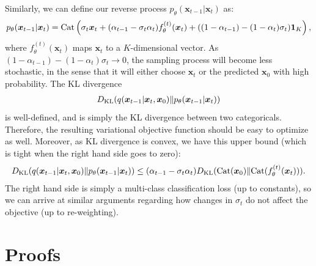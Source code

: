Similarly, we can define our reverse process $p_\theta(\bm{x}_{t-1} | \bm{x}_t)$ as:
\begin{align}
    p_\theta(\bm{x}_{t-1} | \bm{x}_t) = \mathrm{Cat}\left(\sigma_t \bm{x}_t + (\alpha_{t-1} - \sigma_t \alpha_t) f_\theta^{(t)}(\bm{x}_t) + ((1 - \alpha_{t-1}) - (1 - \alpha_t) \sigma_t) {\bm{1}}_K\right),
\end{align}
where $f_\theta^{(t)}(\bm{x}_t)$ maps $\bm{x}_t$ to a $K$-dimensional vector. As $(1 - \alpha_{t-1}) - (1 - \alpha_t) \sigma_t \to 0$, the sampling process will become less stochastic, in the sense that it will either choose $\bm{x}_t$ or the predicted $\bm{x}_0$ with high probability.
The KL divergence
\begin{align}
    D_{\mathrm{KL}}(q(\bm{x}_{t-1} | \bm{x}_t, \bm{x}_0) \Vert p_\theta(\bm{x}_{t-1} | \bm{x}_t))
\end{align}
is well-defined, and is simply the KL divergence between two categoricals. Therefore, the resulting variational objective function should be easy to optimize as well. Moreover, as KL divergence is convex, we have this upper bound (which is tight when the right hand side goes to zero):
\begin{align}
    D_{\mathrm{KL}}(q(\bm{x}_{t-1} | \bm{x}_t, \bm{x}_0) \Vert p_\theta(\bm{x}_{t-1} | \bm{x}_t)) \leq (\alpha_{t-1} - \sigma_t \alpha_t) D_{\mathrm{KL}}(\mathrm{Cat}(\bm{x}_0) \Vert \mathrm{Cat}(f_\theta^{(t)}(\bm{x}_t))). \nonumber
\end{align}
The right hand side is simply a multi-class classification loss (up to constants), so we can arrive at similar arguments regarding how changes in $\sigma_t$ do not affect the objective (up to re-weighting).

\section{Proofs}
\label{app:proofs}

